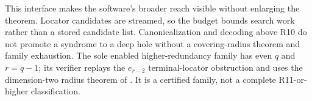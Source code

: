 This interface makes the software's broader reach visible without enlarging
the theorem.  Locator candidates are streamed, so the budget bounds search
work rather than a stored candidate list.  Canonicalization and decoding above
R10 do not promote a syndrome to a deep hole without a covering-radius theorem
and family exhaustion.  The sole enabled higher-redundancy family has even
$q$ and $r=q-1$; its verifier replays the $e_{r-2}$ terminal-locator
obstruction and uses the dimension-two radius theorem of
\cite[Thm.~17(1)]{WuDingChen2023}.  It is a certified family, not a complete
R11-or-higher classification.
